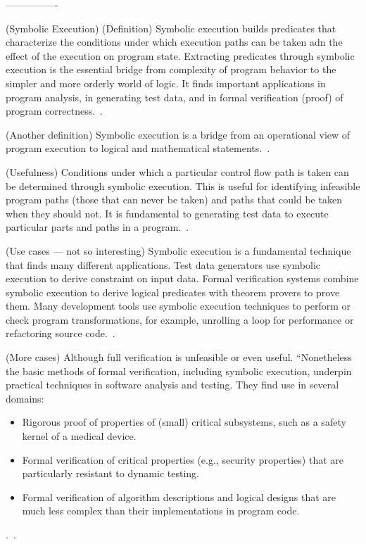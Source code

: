 ----------------

(Symbolic Execution)
(Definition) Symbolic execution builds predicates that characterize the conditions under which execution paths can be taken adn the effect of the execution on program state. Extracting predicates through symbolic execution is the essential bridge from complexity of program behavior to the simpler and more orderly world of logic. It finds important applications in program analysis, in generating test data, and in formal verification (proof) of program correctness.~\cite{BookPezze2008}.

(Another definition) Symbolic execution is a bridge from an operational view of program execution to logical and mathematical statements.~\cite{BookPezze2008}.

(Usefulness) Conditions under which a particular control flow path is taken can be determined through symbolic execution. This is useful for identifying infeasible program paths (those that can never be taken) and paths that could be taken when they should not. It is fundamental to generating test data to execute particular parts and paths in a program.~\cite{BookPezze2008}.

(Use cases --- not so interesting) Symbolic execution is a fundamental technique that finds many different applications. Test data generators use symbolic execution to derive constraint on input data. Formal verification systems combine symbolic execution to derive logical predicates with theorem provers to prove them. Many development tools use symbolic execution techniques to perform or check program transformations, for example, unrolling a loop for performance or refactoring source code.~\cite{BookPezze2008}. 

(More cases) Although full verification is unfeasible or even useful. ``Nonetheless the basic methods of formal verification, including symbolic execution, underpin practical techniques in software analysis and testing. They find use in several domains:

\begin{itemize}
	\item Rigorous proof of properties of (small) critical subsystems, such as a safety kernel of a medical device.
	\item Formal verification of critical properties (e.g., security properties) that are particularly resistant to dynamic testing.
	\item Formal verification of algorithm descriptions and logical designs that are much less complex than their implementations in program code.
\end{itemize}.~\cite{BookPezze2008}.

